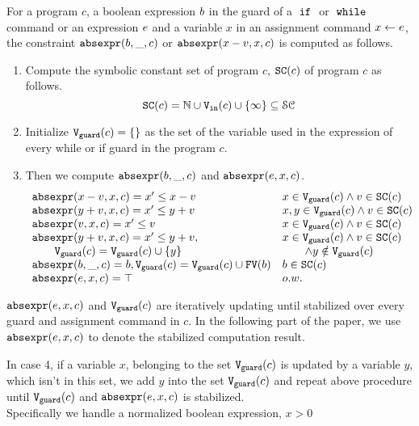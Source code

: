 \begin{defn}
 \label{def:constraint_compute}
 For a program $c$, a boolean expression $b$ in the guard of a $\;\mathtt{if}\;$ or $\;\mathtt{while}\;$ command
 or an expression $e$ and a variable $x$
 in an assignment command $\mathrel{ x \leftarrow e }$,
 the constraint $\mathtt{abs}{\mathtt{expr}}(b, \_, c )$ or $\mathtt{abs}{\mathtt{expr}}(x - v, x, c)$ is computed as follows.
 \begin{enumerate}
 \item Compute the symbolic constant set of program $c$, $\mathtt{SC}(c)$ of program $c$ as follows.
 \[
 \mathtt{SC}(c) = \mathbb{N} \cup {\ensuremath{\mathtt{V_{\mathtt{in}}}}}(c) \cup \{\infty \} \subseteq \mathcal{SC}
 \]
 \item Initialize 
 $\mathtt{V}_{\mathtt{guard}}(c) = \{\}$ as the set of the variable used in the expression of every while or if guard in the program $c$.
 \item Then we compute $\mathtt{abs}{\mathtt{expr}}(b, \_, c )$ and $\mathtt{abs}{\mathtt{expr}}(e, x, c)$.
 \[
 \begin{array}{ll} 
 \mathtt{abs}{\mathtt{expr}}(x - v, x, c) = x' \leq x - v & x \in \mathtt{V}_{\mathtt{guard}}(c)\land v \in \mathtt{SC}(c) \\
 \mathtt{abs}{\mathtt{expr}}(y + v, x, c) = x' \leq y + v & x, y \in \mathtt{V}_{\mathtt{guard}}(c)\land v \in \mathtt{SC}(c)\\
 \mathtt{abs}{\mathtt{expr}}(v, x, c) = x' \leq v & x \in \mathtt{V}_{\mathtt{guard}}(c)\land v \in \mathtt{SC}(c) \\
 \mathtt{abs}{\mathtt{expr}}(y + v, x, c) = x' \leq y + v, & x \in \mathtt{V}_{\mathtt{guard}}(c)\land v \in \mathtt{SC}(c)\\
 \qquad \mathtt{V}_{\mathtt{guard}}(c) = \mathtt{V}_{\mathtt{guard}}(c) \cup \{y\} & \qquad \land y \notin \mathtt{V}_{\mathtt{guard}}(c) \\
 \mathtt{abs}{\mathtt{expr}}(b, \_, c) = b, \mathtt{V}_{\mathtt{guard}}(c) = \mathtt{V}_{\mathtt{guard}}(c) \cup \mathtt{FV}(b) & b \in \mathtt{SC}(c) \\
 \mathtt{abs}{\mathtt{expr}}(e, x, c) = \top & {o.w.} \\
 \end{array}
 \]
 \end{enumerate}
 $\mathtt{abs}{\mathtt{expr}}(e, x, c)$ and $\mathtt{V}_{\mathtt{guard}}(c)$ are iteratively updating until stabilized over every guard and assignment command in $c$. In the following part of the paper, we use $\mathtt{abs}{\mathtt{expr}}(e, x, c)$
 to denote the stabilized computation result.
 \end{defn}
%
In case 4, if a variable $x$, belonging to the set 
 $\mathtt{V}_{\mathtt{guard}}(c)$ is updated by a variable $y$, which isn't in this set, 
 we add $y$ into the set $\mathtt{V}_{\mathtt{guard}}(c)$ and repeat 
 above procedure until $\mathtt{V}_{\mathtt{guard}}(c)$ and $\mathtt{abs}{\mathtt{expr}}(e, x, c)$ is stabilized. 
 \\
Specifically 
we handle a 
normalized boolean expression, $x > 0$
